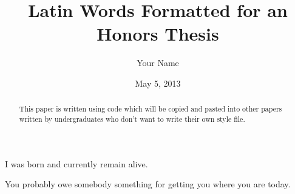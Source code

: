 \documentclass[12pt]{report}
\title{Latin Words Formatted for an Honors Thesis}
\author{Your Name}
\date{May 5, 2013}
\begin{document}

\begin{romanpages}

\ApprovalPage
\TitlePage
\CopyrightPage

\begin{vita}
I was born and currently remain alive.
\end{vita}

\begin{abstract}
This paper is written using code which will be copied and pasted into other papers written by undergraduates who don't want to write their own style file.
\end{abstract}

\begin{acknowledgments}
You probably owe somebody something for getting you where you are today.
\end{acknowledgments} 

\StylePage

\tableofcontents
\listoffigures
\listoftables

\renewcommand{\nomname}{\sc List of Abbreviations}
\printnomenclature[0.75in]

\end{romanpages}

\normalem       %







\begin{appendices}

\end{appendices}






\nocite{travisdiss}
\nocite{travisshort}
\nocite{calgary}
\end{document}
